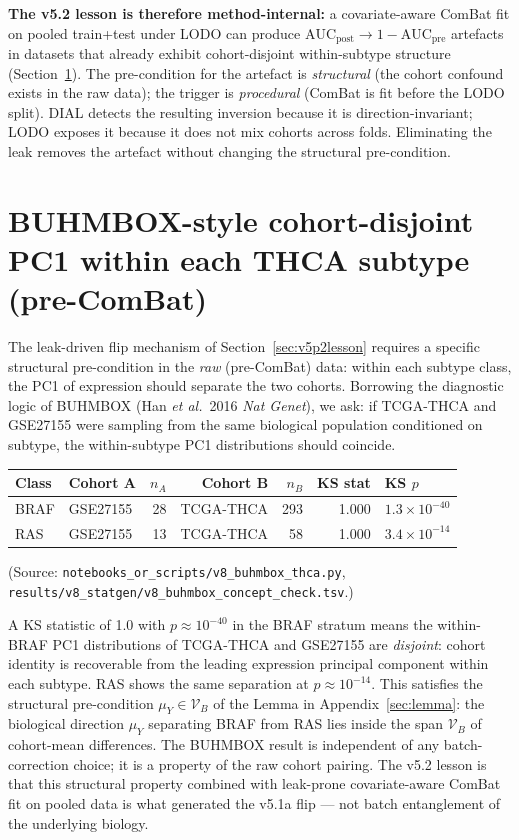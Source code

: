 \documentclass[11pt,a4paper]{article}
\begin{document}
\textbf{The v5.2 lesson is therefore method-internal:} a covariate-aware
ComBat fit on pooled train+test under LODO can produce
$\mathrm{AUC}_{\mathrm{post}} \to 1 - \mathrm{AUC}_{\mathrm{pre}}$
artefacts in datasets that already exhibit cohort-disjoint within-subtype
structure (Section~\ref{sec:bumhbox}). The pre-condition for the artefact
is \emph{structural} (the cohort confound exists in the raw data); the
trigger is \emph{procedural} (ComBat is fit before the LODO split). DIAL
detects the resulting inversion because it is direction-invariant; LODO
exposes it because it does not mix cohorts across folds. Eliminating the
leak removes the artefact without changing the structural pre-condition.

\section{BUHMBOX-style cohort-disjoint PC1 within each THCA subtype (pre-ComBat)}
\label{sec:bumhbox}
The leak-driven flip mechanism of Section~\ref{sec:v5p2lesson} requires a
specific structural pre-condition in the \emph{raw} (pre-ComBat) data:
within each subtype class, the PC1 of expression should separate the two
cohorts. Borrowing the diagnostic logic of BUHMBOX (Han \emph{et al.}\
2016 \emph{Nat Genet}), we ask: if TCGA-THCA and GSE27155 were sampling
from the same biological population conditioned on subtype, the
within-subtype PC1 distributions should coincide.

\begin{tabular}{llrrrrl}\toprule
Class & Cohort A & $n_A$ & Cohort B & $n_B$ & KS stat & KS $p$ \\ \midrule
BRAF & GSE27155 & 28 & TCGA-THCA & 293 & 1.000 & $1.3\times 10^{-40}$ \\
RAS  & GSE27155 & 13 & TCGA-THCA & \phantom{0}58 & 1.000 & $3.4\times 10^{-14}$ \\
\bottomrule\end{tabular}

(Source: \texttt{notebooks\_or\_scripts/v8\_buhmbox\_thca.py},
\texttt{results/v8\_statgen/v8\_buhmbox\_concept\_check.tsv}.)

A KS statistic of 1.0 with $p \approx 10^{-40}$ in the BRAF stratum
means the within-BRAF PC1 distributions of TCGA-THCA and GSE27155 are
\emph{disjoint}: cohort identity is recoverable from the leading
expression principal component within each subtype. RAS shows the
same separation at $p \approx 10^{-14}$. This satisfies the structural
pre-condition $\mu_Y \in \mathcal{V}_B$ of the Lemma in
Appendix~\ref{sec:lemma}: the biological direction $\mu_Y$ separating
BRAF from RAS lies inside the span $\mathcal{V}_B$ of cohort-mean
differences. The BUHMBOX result is independent of any batch-correction
choice; it is a property of the raw cohort pairing. The v5.2 lesson is
that this structural property combined with leak-prone covariate-aware
ComBat fit on pooled data is what generated the v5.1a flip --- not
batch entanglement of the underlying biology.
\end{document}
